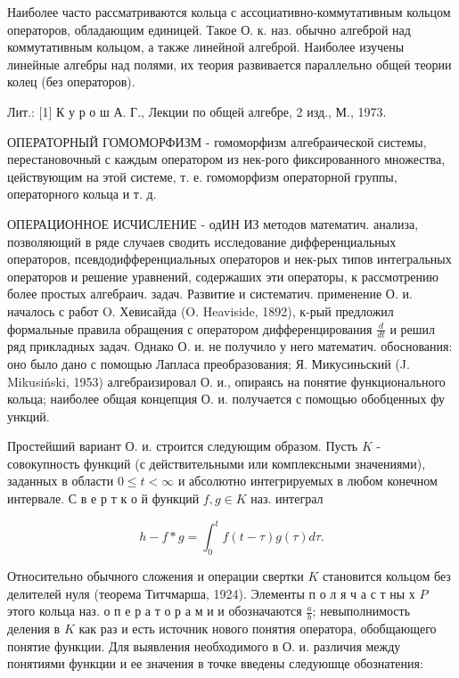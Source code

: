 \documentclass[10pt]{article}
\begin{document}
Наиболее часто рассматриваются кольца с ассоциативно-коммутативным кольцом операторов, обладающим единицей. Такое О. к. наз. обычно алгеброй над коммутативным кольцом, а также линейной алгеброй. Наиболее изучены линейные алгебры над полями, их теория развивается параллельно общеӥ теории колец (без операторов).



Лит.: [1] К у р о ш А. Г., Лекции по общей алгебре, 2 изд., М., 1973.



ОПЕРАТОРНЫЙ ГОМОМОРФИЗМ - гомоморфизм алгебраической системы, перестановочный с каждым оператором из нек-рого фиксированного множества, цействующим на этой системе, т. е. гомоморфизм операторной группы, операторного кольца и т. д.



ОПЕРАЦИОННОЕ ИСЧИСЛЕНИЕ - одИН ИЗ методов математич. анализа, позволяющий в ряде случаев сводить исследование дифференциальных операторов, псевдодифференциальных операторов и нек-рых типов интегральных операторов и решение уравнений, содержаших эти операторы, к рассмотрению более простых алгебраич. задач. Развитие и систематич. применение О. и. началось с работ O. Хевисайда (O. Heaviside, 1892), к-рый предложил формальные правила обращения с оператором дифференцирования $\frac{d}{d t}$ и решил ряд прикладных задач. Однако О. и. не получило у него математич. обоснования: оно было дано с помощью Лапласа преобразования; Я. Микусиньский (J. Mikusiński, 1953) алгебраизировал О. и., опираясь на понятие функционального кольца; наиболее общая концепция О. и. получается с помощью обобценных фу ункций.



Простейший вариант О. и. строится следующим образом. Пусть $K$ - совокупность функций (с действительными или комплексными значениями), заданных в области $0 \leqslant t<\infty$ и абсолютно интегрируемых в любом конечном интервале. С в е р т к о й функций $f, g \in K$ наз. интеграл



\[

h-f * g=\int_{0}^{t} f(t-\tau) g(\tau) d \tau .

\]



Относительно обычного сложения и операции свертки $K$ становится кольцом без делителей нуля (теорема Титчмарша, 1924). Элементы п о л я ч а с т ны х $P$ этого кольца наз. о п е р а т о р а м и и обозначаются $\frac{a}{b}$; невыполнимость деления в $K$ как раз и есть источник нового понятия оператора, обобщающего понятие функции. Для выявления необходимого в О. и. различия между понятиями функции и ее значения в точке введены следуюшце обознатения:
\end{document}
